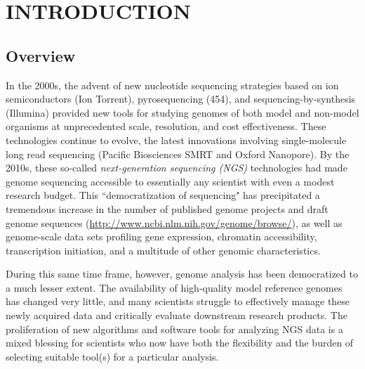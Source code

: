 \chapter{INTRODUCTION}

\section{Overview}

In the 2000s, the advent of new nucleotide sequencing strategies based on ion semiconductors (Ion Torrent), pyrosequencing (454), and sequencing-by-synthesis (Illumina) provided new tools for studying genomes of both model and non-model organisms at unprecedented scale, resolution, and cost effectiveness.
These technologies continue to evolve, the latest innovations involving single-molecule long read sequencing (Pacific Biosciences SMRT and Oxford Nanopore).
By the 2010s, these so-called \textit{next-generation sequencing (NGS)} technologies had made genome sequencing accessible to essentially any scientist with even a modest research budget.
This ``democratization of sequencing" has precipitated a tremendous increase in the number of published genome projects and draft genome sequences (\url{http://www.ncbi.nlm.nih.gov/genome/browse/}), as well as genome-scale data sets profiling gene expression, chromatin accessibility, transcription initiation, and a multitude of other genomic characteristics.

During this same time frame, however, genome analysis has been democratized to a much lesser extent.
The availability of high-quality model reference genomes has changed very little, and many scientists struggle to effectively manage these newly acquired data and critically evaluate downstream research products.
The proliferation of new algorithms and software tools for analyzing NGS data is a mixed blessing for scientists who now have both the flexibility and the burden of selecting suitable tool(s) for a particular analysis.

